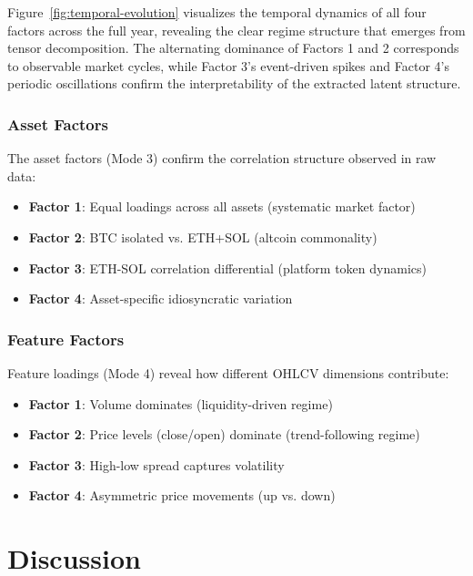 \documentclass[11pt,twocolumn]{article}
\begin{document}
Figure~\ref{fig:temporal-evolution} visualizes the temporal dynamics of all four factors across the full year, revealing the clear regime structure that emerges from tensor decomposition. The alternating dominance of Factors 1 and 2 corresponds to observable market cycles, while Factor 3's event-driven spikes and Factor 4's periodic oscillations confirm the interpretability of the extracted latent structure.

\subsubsection{Asset Factors}

The asset factors (Mode 3) confirm the correlation structure observed in raw data:

\begin{itemize}[leftmargin=*]
    \item \textbf{Factor 1}: Equal loadings across all assets (systematic market factor)
    \item \textbf{Factor 2}: BTC isolated vs. ETH+SOL (altcoin commonality)
    \item \textbf{Factor 3}: ETH-SOL correlation differential (platform token dynamics)
    \item \textbf{Factor 4}: Asset-specific idiosyncratic variation
\end{itemize}

\subsubsection{Feature Factors}

Feature loadings (Mode 4) reveal how different OHLCV dimensions contribute:

\begin{itemize}[leftmargin=*]
    \item \textbf{Factor 1}: Volume dominates (liquidity-driven regime)
    \item \textbf{Factor 2}: Price levels (close/open) dominate (trend-following regime)
    \item \textbf{Factor 3}: High-low spread captures volatility
    \item \textbf{Factor 4}: Asymmetric price movements (up vs. down)
\end{itemize}

\section{Discussion}
\label{sec:discussion}
\end{document}
